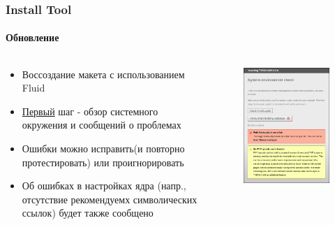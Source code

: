 \begin{frame}[fragile]
	\frametitle{Install Tool}
	\framesubtitle{Обновление}

	\begin{columns}[T]

		\begin{column}{.5\textwidth}
			\begin{itemize}
				\item Воссоздание макета с использованием Fluid
				\item \underline{Первый} шаг - обзор системного окружения и сообщений о проблемах
				\item Ошибки можно исправить\newline (и повторно протестировать) или проигнорировать
				\item Об ошибках в настройках ядра (напр., отсутствие рекомендуемх символических ссылок) будет также сообщено
			\end{itemize}
		\end{column}

		\begin{column}{.5\textwidth}
			\begin{figure}\vspace*{-0.4cm}
				\includegraphics[width=0.8\linewidth]{Images/InstallTool/SystemEnvironmentCheck.png}
			\end{figure}
		\end{column}

	\end{columns}

\end{frame}


